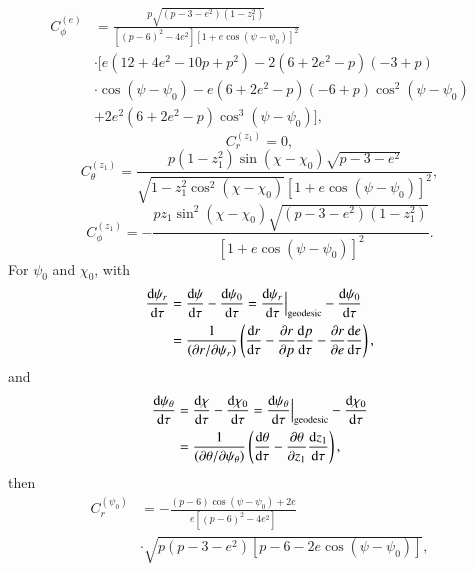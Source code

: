 \documentclass[aps,prx,reprint,superscriptaddress,nofootinbib,longbibliography]{revtex4-1}
\begin{document}
\begin{equation}
    \begin{aligned}
        C^{(e)}_{\phi}&=\frac{p\sqrt{(p-3-e^{2})(1-z_{1}^{2})}}{[(p-6)^{2}-4e^{2}][1+e\cos(\psi-\psi_{0})]^{2}}\\
        &\cdot [e(12+4e^{2}-10p+p^{2})-2(6+2e^{2}-p)(-3+p)\\
        &\cdot\cos(\psi-\psi_{0})-e(6+2e^{2}-p)(-6+p)\cos^{2}(\psi-\psi_{0})\\
        &+2e^{2}(6+2e^{2}-p)\cos^{3}(\psi-\psi_{0})],
    \end{aligned}
\end{equation}
\begin{equation}
    C^{(z_{1})}_{r}=0,
\end{equation}
\begin{equation}
    C^{(z_{1})}_{\theta}=\frac{p(1-z_{1}^{2})\sin(\chi-\chi_{0})\sqrt{p-3-e^{2}}}{\sqrt{1-z_{1}^{2}\cos^{2}(\chi-\chi_{0})}[1+e\cos(\psi-\psi_{0})]^{2}},
    \label{eq:Cz1theta}
\end{equation}
\begin{equation}
    C^{(z_{1})}_{\phi}=-\frac{pz_{1}\sin^{2}(\chi-\chi_{0})\sqrt{(p-3-e^{2})(1-z_{1}^{2})}}{[1+e\cos(\psi-\psi_{0})]^{2}}.
    \label{eq:Cz1phi}
\end{equation}
For $\psi_{0}$ and $\chi_{0}$, with
\begin{equation}
    \begin{aligned}
        \dv{\psi_{r}}{\tau}&=\dv{\psi}{\tau}-\dv{\psi_{0}}{\tau}=\dv{\psi_{r}}{\tau}\Big|_{\rm geodesic}-\dv{\psi_{0}}{\tau}\\
        &=\frac{1}{(\partial r/\partial\psi_{r})}\left(\dv{r}{\tau}-\pdv{r}{p}\dv{p}{\tau}-\pdv{r}{e}\dv{e}{\tau}\right),
    \end{aligned}
\end{equation}
and
\begin{equation}
    \begin{aligned}
        \dv{\psi_{\theta}}{\tau}&=\dv{\chi}{\tau}-\dv{\chi_{0}}{\tau}=\dv{\psi_{\theta}}{\tau}\Big|_{\rm geodesic}-\dv{\chi_{0}}{\tau}\\
        &=\frac{1}{(\partial\theta/\partial\psi_{\theta})}\left(\dv{\theta}{\tau}-\pdv{\theta}{z_{1}}\dv{z_{1}}{\tau}\right),
    \end{aligned}
\end{equation}
then
\begin{equation}
\begin{aligned}
    C^{(\psi_{0})}_{r}&=-\frac{(p-6)\cos(\psi-\psi_{0})+2e}{e[(p-6)^{2}-4e^{2}]}\\
    &\cdot\sqrt{p(p-3-e^{2})[p-6-2e\cos(\psi-\psi_{0})]},
\end{aligned}
\end{equation}
\end{document}
